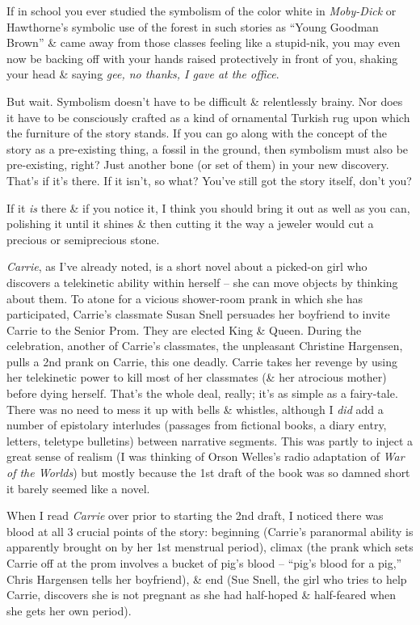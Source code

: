 \documentclass{article}
\numberwithin{equation}{section}
\begin{document}
If in school you ever studied the symbolism of the color white in \textit{Moby-Dick} or Hawthorne's symbolic use of the forest in such stories as ``Young Goodman Brown'' \& came away from those classes feeling like a stupid-nik, you may even now be backing off with your hands raised protectively in front of you, shaking your head \& saying \textit{gee, no thanks, I gave at the office}.

But wait. Symbolism doesn't have to be difficult \& relentlessly brainy. Nor does it have to be consciously crafted as a kind of ornamental Turkish rug upon which the furniture of the story stands. If you can go along with the concept of the story as a pre-existing thing, a fossil in the ground, then symbolism must also be pre-existing, right? Just another bone (or set of them) in your new discovery. That's if it's there. If it isn't, so what? You've still got the story itself, don't you?

If it \textit{is} there \& if you notice it, I think you should bring it out as well as you can, polishing it until it shines \& then cutting it the way a jeweler would cut a precious or semiprecious stone.

\textit{Carrie}, as I've already noted, is a short novel about a picked-on girl who discovers a telekinetic ability within herself -- she can move objects by thinking about them. To atone for a vicious shower-room prank in which she has participated, Carrie's classmate Susan Snell persuades her boyfriend to invite Carrie to the Senior Prom. They are elected King \& Queen. During the celebration, another of Carrie's classmates, the unpleasant Christine Hargensen, pulls a 2nd prank on Carrie, this one deadly. Carrie takes her revenge by using her telekinetic power to kill most of her classmates (\& her atrocious mother) before dying herself. That's the whole deal, really; it's as simple as a fairy-tale. There was no need to mess it up with bells \& whistles, although I \textit{did} add a number of epistolary interludes (passages from fictional books, a diary entry, letters, teletype bulletins) between narrative segments. This was partly to inject a great sense of realism (I was thinking of Orson Welles's radio adaptation of \textit{War of the Worlds}) but mostly because the 1st draft of the book was so damned short it barely seemed like a novel.

When I read \textit{Carrie} over prior to starting the 2nd draft, I noticed there was blood at all 3 crucial points of the story: beginning (Carrie's paranormal ability is apparently brought on by her 1st menstrual period), climax (the prank which sets Carrie off at the prom involves a bucket of pig's blood -- ``pig's blood for a pig,'' Chris Hargensen tells her boyfriend), \& end (Sue Snell, the girl who tries to help Carrie, discovers she is not pregnant as she had half-hoped \& half-feared when she gets her own period).
\end{document}
